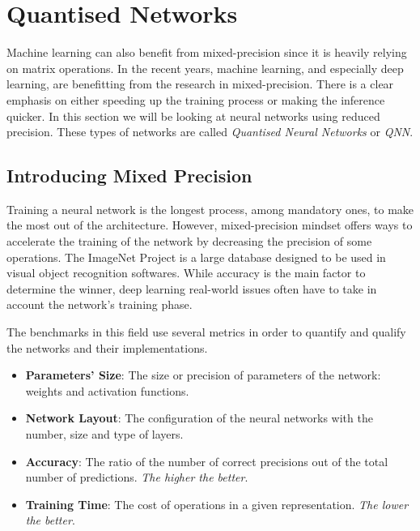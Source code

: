 \section{Quantised Networks}

Machine learning can also benefit from mixed-precision since it is heavily relying on matrix operations. In the recent years, machine learning, and especially deep learning, are benefitting from the research in mixed-precision. There is a clear emphasis on either speeding up the training process or making the inference quicker. In this section we will be looking at neural networks using reduced precision. These types of networks are called \emph{Quantised Neural Networks} or \emph{QNN}.


\subsection{Introducing Mixed Precision}

Training a neural network is the longest process, among mandatory ones, to make the most out of the architecture. However, mixed-precision mindset offers ways to accelerate the training of the network by decreasing the precision of some operations. The ImageNet Project \cite{ImageNet2009} is a large database designed to be used in visual object recognition softwares.  While accuracy is the main factor to determine the winner, deep learning real-world issues often have to take in account the network's training phase.

The benchmarks in this field use several metrics in order to quantify and qualify the networks and their implementations.
\begin{itemize}
	\item \textbf{Parameters' Size}: The size or precision of parameters of the network: weights and activation functions.
	\item \textbf{Network Layout}: The configuration of the neural networks with the number, size and type of layers.
	\item \textbf{Accuracy}: The ratio of the number of correct precisions out of the total number of predictions. \emph{The higher the better}.
	\item \textbf{Training Time}: The cost of operations in a given representation. \emph{The lower the better}.
\end{itemize}

